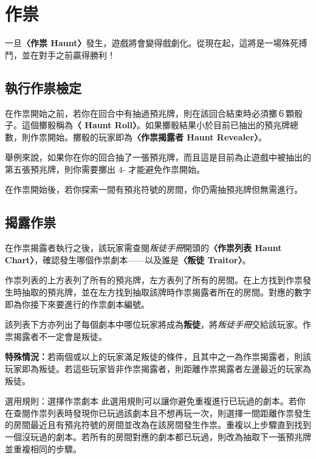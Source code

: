 
\section{作祟} \label{sec:haunt}

一旦\textbf{〈作祟 Haunt〉}發生，遊戲將會變得戲劇化。從現在起，這將是一場殊死搏鬥，並在對手之前贏得勝利！


\subsection{執行作祟檢定} \label{ssec:making-a-haunt-roll}

在作祟開始之前，若你在回合中有抽過預兆牌，則在該回合結束時必須擲６顆骰子。這個擲骰稱為\textbf{〈 Haunt Roll〉}。如果擲骰結果小於目前已抽出的預兆牌總數，則作祟開始。擲骰的玩家即為\textbf{〈作祟揭露者 Haunt Revealer〉}。

舉例來說，如果你在你的回合抽了一張預兆牌，而且這是目前為止遊戲中被抽出的第五張預兆牌，則你需要擲出 4- 才能避免作祟開始。

在作祟開始後，若你探索一間有預兆符號的房間，你仍需抽預兆牌但無需進行。


\subsection{揭露作祟} \label{ssec:revealing-the-roll}

在作祟揭露者執行之後，該玩家需查閱\emph{叛徒手冊}開頭的\textbf{〈作祟列表 Haunt Chart〉}，確認發生哪個作祟劇本——以及誰是\textbf{〈叛徒 Traitor〉}。

作祟列表的上方表列了所有的預兆牌，左方表列了所有的房間。在上方找到作祟發生時抽取的預兆牌，並在左方找到抽取該牌時作祟揭露者所在的房間。對應的數字即為你接下來要進行的作祟劇本編號。

該列表下方亦列出了每個劇本中哪位玩家將成為\textbf{叛徒}，將\emph{叛徒手冊}交給該玩家。作祟揭露者不一定會是叛徒。

\textbf{特殊情況：}若兩個或以上的玩家滿足叛徒的條件，且其中之一為作祟揭露者，則該玩家即為叛徒。若這些玩家皆非作祟揭露者，則距離作祟揭露者左邊最近的玩家為叛徒。

\begin{RuleBox}{選用規則：選擇作祟劇本}
  此選用規則可以讓你避免重複進行已玩過的劇本。若你在查閱作祟列表時發現你已玩過該劇本且不想再玩一次，則選擇一間距離作祟發生的房間最近且有預兆符號\OmenSymbol{}的房間並改為在該房間發生作祟。重複以上步驟直到找到一個沒玩過的劇本。若所有的房間對應的劇本都已玩過，則改為抽取下一張預兆牌並重複相同的步驟。
\end{RuleBox}


